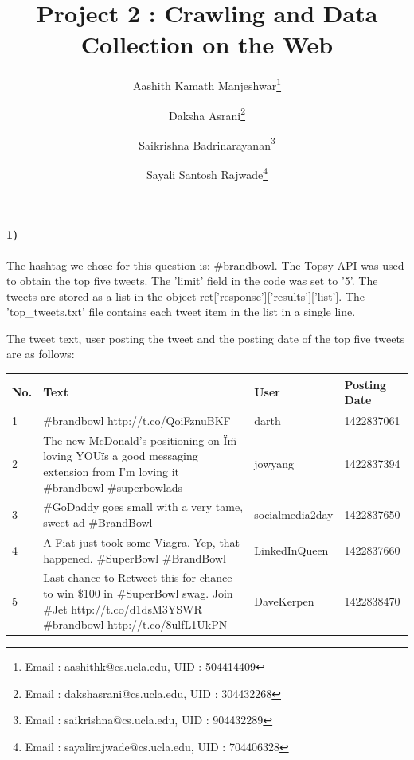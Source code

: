 \documentclass{article}
\title{Project 2 : Crawling and Data Collection on the Web}
\author{Aashith Kamath Manjeshwar\footnote{Email : aashithk@cs.ucla.edu, UID : 504414409} 
\and Daksha Asrani\footnote{Email : dakshasrani@cs.ucla.edu, UID : 304432268}
\and Saikrishna Badrinarayanan\footnote{Email : saikrishna@cs.ucla.edu, UID : 904432289} 
\and Sayali Santosh Rajwade\footnote{Email : sayalirajwade@cs.ucla.edu, UID : 704406328}}
\begin{document}
\maketitle

\paragraph{1)}

The hashtag we chose for this question is: $\#$brandbowl. The Topsy API was used to obtain the top five tweets. The 'limit' 
field in the code was set to '5'. The tweets are stored as a list in the object ret['response']['results']['list'].
The 'top\_tweets.txt' file contains each tweet item in the list in a single line.

The tweet text, user posting the tweet and the posting date of the top five tweets are as follows:

\begin{table}[H]
\centering
\begin{tabular}{ |p{.4cm}| p{6cm}| p{2.4cm} |p{2cm} |}
\hline

\centering No. & \centering Text & \centering User & Posting Date \\ [0.5ex]

\hline
1 & \#brandbowl http://t.co/QoiFznuBKF & \centering darth & 1422837061 \\
2 & The new McDonald's positioning on \"I\"m loving YOU\" is a good messaging extension from I'm loving it \#brandbowl 
\#superbowlads & \centering jowyang & 1422837394\\
3 & \#GoDaddy goes small with a very tame, sweet ad \#BrandBowl & socialmedia2day & 1422837650 \\
4 & A Fiat just took some Viagra. Yep, that happened. \#SuperBowl \#BrandBowl & LinkedInQueen & 1422837660 \\
5 & Last chance to Retweet this for chance to win \$100 in \#SuperBowl swag. Join 
\#Jet \@ http://t.co/d1dsM3YSWR \#brandbowl http://t.co/8ulfL1UkPN & \centering DaveKerpen & 1422838470 \\
\hline
\end{tabular}
\end{table}
\end{document}
